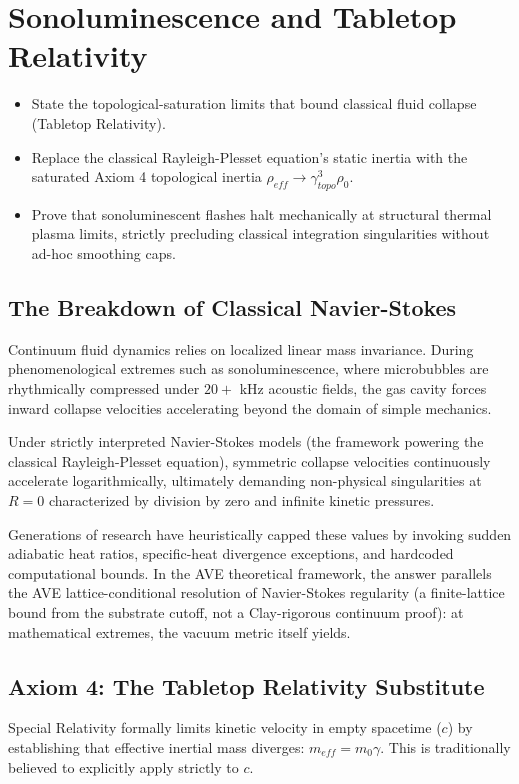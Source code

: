 \chapter{Sonoluminescence and Tabletop Relativity}
\label{ch:sonoluminescence_tabletop_relativity}

\begin{objectivebox}
\begin{itemize}
    \item State the topological-saturation limits that bound classical fluid collapse (Tabletop Relativity).
    \item Replace the classical Rayleigh-Plesset equation's static inertia with the saturated Axiom 4 topological inertia $\rho_{eff} \rightarrow \gamma_{topo}^3 \rho_0$.
    \item Prove that sonoluminescent flashes halt mechanically at structural thermal plasma limits, strictly precluding classical integration singularities without ad-hoc smoothing caps.
\end{itemize}
\end{objectivebox}

\section{The Breakdown of Classical Navier-Stokes}
Continuum fluid dynamics relies on localized linear mass invariance. During phenomenological extremes such as sonoluminescence, where microbubbles are rhythmically compressed under $20+$ kHz acoustic fields, the gas cavity forces inward collapse velocities accelerating beyond the domain of simple mechanics. 

Under strictly interpreted Navier-Stokes models (the framework powering the classical Rayleigh-Plesset equation), symmetric collapse velocities continuously accelerate logarithmically, ultimately demanding non-physical singularities at $R=0$ characterized by division by zero and infinite kinetic pressures.

Generations of research have heuristically capped these values by invoking sudden adiabatic heat ratios, specific-heat divergence exceptions, and hardcoded computational bounds. In the AVE theoretical framework, the answer parallels the AVE lattice-conditional resolution of Navier-Stokes regularity (a finite-lattice bound from the substrate cutoff, not a Clay-rigorous continuum proof): at mathematical extremes, the vacuum metric itself yields.

\section{Axiom 4: The Tabletop Relativity Substitute}
Special Relativity formally limits kinetic velocity in empty spacetime ($c$) by establishing that effective inertial mass diverges: $m_{eff} = m_0 \gamma$. This is traditionally believed to explicitly apply strictly to $c$.

